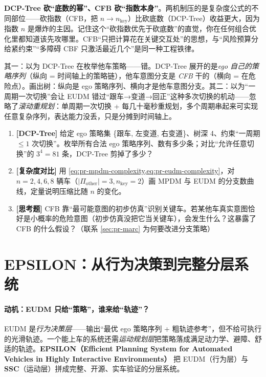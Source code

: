 \begin{insight}
\textbf{DCP-Tree 砍“底数的幂”、CFB 砍“指数本身”}。两机制压的是复杂度公式的不同部位——砍指数（CFB，把 $n\to n_{\mathrm{key}}$）比砍底数（DCP-Tree）收益更大，因为指数 $n$ 是爆炸的主因。记住这个“砍指数优先于砍底数”的直觉，你在任何组合优化里都知道该先攻哪里。CFB“只把计算花在关键交互处”的思想，与“风险预算分给紧约束”“多障碍 CBF 只激活最近几个”是同一种工程铁律。
\end{insight}

\begin{pitfall}
其一：以为 DCP-Tree 在枚举他车策略——错。DCP-Tree 展开的是\emph{ego 自己的策略序列}（纵向 = 时间轴上的策略链），他车意图分支是 \emph{CFB} 干的（横向 = 在危险点）。画出树：纵向是 ego 策略序列、横向才是他车意图分支。其二：以为“一周期一次切换”会让 EUDM 错过“跟车→变道→回正”这种多次切换的机动——忽略了\emph{滚动重规划}：单周期一次切换 + 每几十毫秒重规划，多个周期串起来可实现任意复杂序列，表达能力没丢，只是分摊到时间轴上。
\end{pitfall}

\begin{practice}
\begin{enumerate}
  \item \textbf{[DCP-Tree]} 给定 ego 策略集 \{跟车, 左变道, 右变道\}、树深 4、约束“一周期 $\le 1$ 次切换”。枚举所有合法 ego 策略序列、数有多少条；对比“允许任意切换”的 $3^4=81$ 条，DCP-Tree 剪掉了多少？
  \item \textbf{[复杂度对比]} 用 \cref{eq:pr-mpdm-complexity,eq:pr-eudm-complexity}，对 $n=2,4,6,8$ 辆车（$|\Pi_{\mathrm{other}}|=3,n_{\mathrm{key}}=2$）画 MPDM 与 EUDM 的分支数曲线，定量说明压缩比随 $n$ 的变化。
  \item \textbf{[思考题]} CFB 靠“最可能意图的初步仿真”识别关键车。若某他车真实意图恰好是小概率的危险意图（初步仿真没把它当关键车），会发生什么？这暴露了 CFB 的什么假设？（联系 \cref{sec:pr-marc} 为何要改进分支策略）
\end{enumerate}
\end{practice}

\section{EPSILON：从行为决策到完整分层系统}
\label{sec:pr-epsilon}

\paragraph{动机：EUDM 只给“策略”，谁来给“轨迹”？}
EUDM 是\emph{行为决策层}——输出“最优 ego 策略序列 + 粗轨迹参考”，但不给可执行的光滑轨迹。一个能上车的系统还需\emph{运动规划层}把策略落成满足动力学、避障、舒适的轨迹。\textbf{EPSILON（Efficient Planning System for Automated Vehicles in Highly Interactive Environments）}\cite{ding2021epsilon} 把 EUDM（行为层）与 \textbf{SSC}（运动层）拼成完整、开源、实车验证的分层系统。

